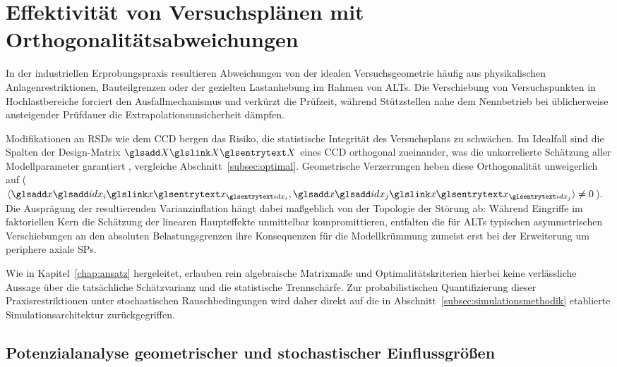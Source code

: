 
\section{Effektivität von Versuchsplänen mit Orthogonalitätsabweichungen} \label{sec:abweichungen}

In der industriellen Erprobungspraxis resultieren Abweichungen von der idealen Versuchsgeometrie häufig aus physikalischen Anlagenrestriktionen, Bauteilgrenzen oder der gezielten Lastanhebung im Rahmen von \acp{ALT}.
Die Verschiebung von Versuchspunkten in Hochlastbereiche forciert den Ausfallmechanismus und verkürzt die Prüfzeit, während Stützstellen nahe dem Nennbetrieb bei üblicherweise ansteigender Prüfdauer die Extrapolationsunsicherheit dämpfen.

Modifikationen an \acp{RSD} wie dem \ac{CCD} bergen das Risiko, die statistische Integrität des Versuchsplans zu schwächen.
Im Idealfall sind die Spalten der Design-Matrix $\sym{X}$ eines \ac{CCD} orthogonal zueinander, was die unkorrelierte Schätzung aller Modellparameter garantiert \cite{Montgomery.2020}, vergleiche Abschnitt~\ref{subsec:optimal}.
Geometrische Verzerrungen heben diese Orthogonalität unweigerlich auf ($\langle \symsub{x}{idx_i}, \symsub{x}{idx_j} \rangle \neq 0$).
Die Ausprägung der resultierenden Varianzinflation hängt dabei maßgeblich von der Topologie der Störung ab: Während Eingriffe im faktoriellen Kern die Schätzung der linearen Haupteffekte unmittelbar kompromittieren, entfalten die für \acp{ALT} typischen asymmetrischen Verschiebungen an den absoluten Belastungsgrenzen ihre Konsequenzen für die Modellkrümmung zumeist erst bei der Erweiterung um periphere axiale \acp{SP}.

Wie in Kapitel~\ref{chap:ansatz} hergeleitet, erlauben rein algebraische Matrixmaße und Optimalitätskriterien hierbei keine verlässliche Aussage über die tatsächliche Schätzvarianz und die statistische Trennschärfe.
Zur probabilistischen Quantifizierung dieser Praxisrestriktionen unter stochastischen Rauschbedingungen wird daher direkt auf die in Abschnitt~\ref{subsec:simulationsmethodik} etablierte Simulationsarchitektur zurückgegriffen.

\subsection{Potenzialanalyse geometrischer und stochastischer Einflussgrößen} \label{subsec:sensitivitaetsanalyse}

